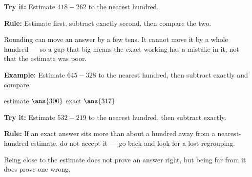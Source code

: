 \documentclass[12pt]{article}
\begin{document}
\begin{tryitbox}
\textbf{Try it:} \quad Estimate $418 - 262$ to the nearest hundred.\\[2pt]
\end{tryitbox}


\begin{formulabox}
\textbf{Rule:} Estimate first, subtract exactly second, then compare the two.\par
Rounding can move an answer by a few tens. It cannot move it by a whole hundred --- so a gap that big means the exact working has a mistake in it, not that the estimate was poor.
\end{formulabox}

\begin{examplebox}
\textbf{Example:} \quad Estimate $645 - 328$ to the nearest hundred, then subtract exactly and compare.

estimate $\ans{300}$ \qquad exact $\ans{317}$
\end{examplebox}

\begin{tryitbox}
\textbf{Try it:} \quad Estimate $532 - 219$ to the nearest hundred, then subtract exactly.\\[2pt]
\end{tryitbox}


\begin{formulabox}
\textbf{Rule:} If an exact answer sits more than about a hundred away from a nearest-hundred estimate, do not accept it --- go back and look for a lost regrouping.\par
Being close to the estimate does not prove an answer right, but being far from it does prove one wrong.
\end{formulabox}
\end{document}
